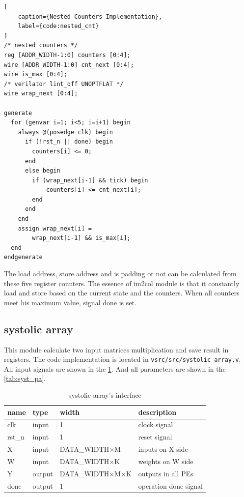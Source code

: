 \documentclass[conference]{IEEEtran}
\begin{document}
\begin{lstlisting}[
    caption={Nested Counters Implementation},
    label={code:nested_cnt}
]
/* nested counters */
reg [ADDR_WIDTH-1:0] counters [0:4];
wire [ADDR_WIDTH-1:0] cnt_next [0:4];
wire is_max [0:4];
/* verilator lint_off UNOPTFLAT */
wire wrap_next [0:4];

generate
  for (genvar i=1; i<5; i=i+1) begin
    always @(posedge clk) begin
      if (!rst_n || done) begin
        counters[i] <= 0;
      end
      else begin
        if (wrap_next[i-1] && tick) begin
            counters[i] <= cnt_next[i];
        end
      end
    end
    assign wrap_next[i] = 
        wrap_next[i-1] && is_max[i];
  end
endgenerate
\end{lstlisting}
The load address, store address and is padding or not can be calculated from these five register counters.
The essence of im2col module is that it constantly load and store based on the current state and the counters.
When all counters meet his maximum value, signal done is set.

\subsection{systolic array}

This module calculate two input matrices multiplication and save result in registers.
The code implementation is located in \verb|vsrc/src/systolic_array.v|.
All input signals are shown in the \ref{tab:syst_if}.
And all parameters are shown in the \ref{tab:syst_pa}.

\begin{table}[ht]
  \caption{systolic array's interface}
  \centering
  \begin{tabular}{|l|l|l|l|}
    \hline
    \textbf{name} & \textbf{type} & \textbf{width}                & \textbf{description}  \\ \hline
    clk           & input         & 1                             & clock signal          \\ \hline
    rst\_n        & input         & 1                             & reset signal          \\ \hline
    X             & input         & DATA\_WIDTH$\times$M          & inputs on X side      \\ \hline
    W             & input         & DATA\_WIDTH$\times$K          & weights on W side     \\ \hline
    Y             & output        & DATA\_WIDTH$\times$M$\times$K & outputs in all PEs    \\ \hline
    done          & output        & 1                             & operation done signal \\ \hline
  \end{tabular}
  \label{tab:ports_description}
  \label{tab:syst_if}
\end{table}
\end{document}
